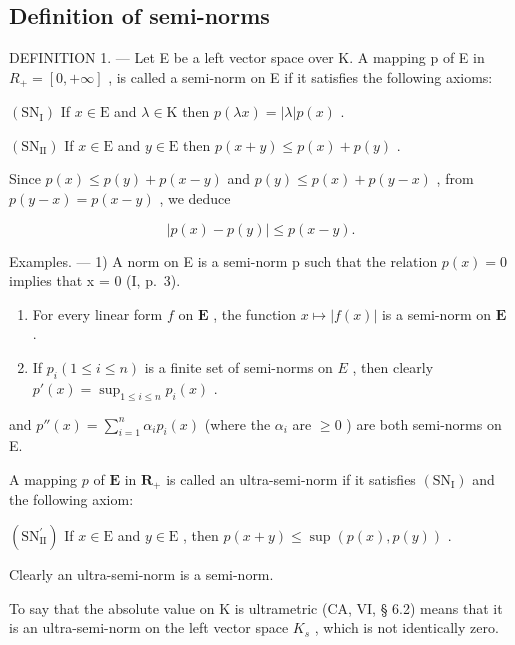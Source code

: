 \subsection{Definition of semi-norms}

DEFINITION 1. --- Let E be a left vector space over K. A mapping p of E in \(R_{+} = \left[0, +\infty\right]\) , is called a semi-norm on E if it satisfies the following axioms:

\((\mathrm{SN}_{\mathrm{I}})\) If \(x \in \mathrm{E}\) and \(\lambda \in \mathrm{K}\) then \(p(\lambda x) = |\lambda| p(x)\) .

\((\mathrm{SN}_{\mathrm{II}})\) If \(x \in \mathrm{E}\) and \(y \in \mathrm{E}\) then \(p(x + y) \leqslant p(x) + p(y)\) .

Since \(p(x) \leqslant p(y) + p(x - y)\) and \(p(y) \leqslant p(x) + p(y - x)\) , from \(p(y - x) = p(x - y)\) , we deduce

\[
\left| p (x) - p (y) \right| \leqslant p (x - y).\tag{1}
\]

Examples. --- 1) A norm on E is a semi-norm p such that the relation \(p(x) = 0\) implies that x = 0 (I, p.~3).

\begin{enumerate}
\def\labelenumi{\arabic{enumi})}
\setcounter{enumi}{1}
\item
  For every linear form \(f\) on \(\mathbf{E}\) , the function \(x \mapsto |f(x)|\) is a semi-norm on \(\mathbf{E}\) .
\item
  If \(p_i (1 \leqslant i \leqslant n)\) is a finite set of semi-norms on \(E\) , then clearly \(p'(x) = \sup_{1 \leqslant i \leqslant n} p_i(x)\) .
\end{enumerate}

and \(p''(x) = \sum_{i=1}^{n} \alpha_i p_i(x)\) (where the \(\alpha_i\) are \(\geqslant 0\) ) are both semi-norms on E.

A mapping \(p\) of \(\mathbf{E}\) in \(\mathbf{R}_{+}\) is called an ultra-semi-norm if it satisfies \((\mathrm{SN}_{\mathrm{I}})\) and the following axiom:

\((\mathrm{SN}_{\mathrm{II}}^{\prime})\) If \(x \in \mathrm{E}\) and \(y \in \mathrm{E}\) , then \(p(x + y) \leqslant \sup(p(x), p(y))\) .

Clearly an ultra-semi-norm is a semi-norm.

To say that the absolute value on K is ultrametric (CA, VI, § 6.2) means that it is an ultra-semi-norm on the left vector space \(K_{s}\) , which is not identically zero.

